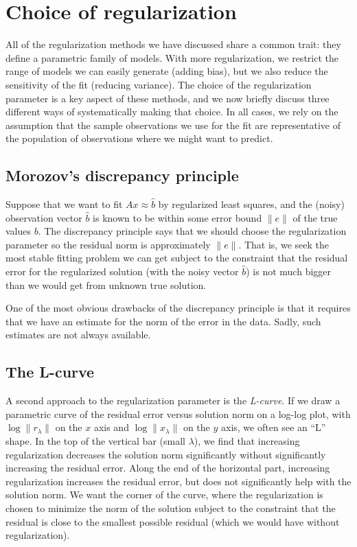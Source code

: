 \section{Choice of regularization}

All of the regularization methods we have discussed share a common
trait: they define a parametric family of models.  With more
regularization, we restrict the range of models we can easily generate
(adding bias), but we also reduce the sensitivity of the fit (reducing
variance). The choice of the regularization parameter is a key aspect of
these methods, and we now briefly discuss three different ways of
systematically making that choice.  In all cases, we
rely on the assumption that the sample observations we use for the
fit are representative of the population of observations where we might
want to predict.

\subsection{Morozov's discrepancy principle}

Suppose that we want to fit $Ax \approx \hat{b}$ by regularized least
squares, and the (noisy) observation vector $\hat{b}$ is known to be
within some error bound $\|e\|$ of the true values $b$. The discrepancy
principle says that we should choose the regularization parameter so the
residual norm is approximately $\|e\|$. That is, we seek the most stable
fitting problem we can get subject to the constraint that the residual
error for the regularized solution (with the noisy vector $\hat{b}$) is
not much bigger than we would get from unknown true solution.

One of the most obvious drawbacks of the discrepancy principle is that
it requires that we have an estimate for the norm of the error in the
data.  Sadly, such estimates are not always available.

\subsection{The L-curve}

A second approach to the regularization parameter is the {\em L-curve}.
If we draw a parametric curve of the residual error versus solution norm
on a log-log plot, with $\log \|r_{\lambda}\|$ on the $x$ axis
and $\log \|x_{\lambda}\|$ on the $y$ axis, we often see an ``L'' shape.
In the top of the vertical bar (small $\lambda$), we find that increasing
regularization decreases the solution norm significantly without significantly
increasing the residual error.  Along the end of the horizontal part,
increasing regularization increases the residual error, but does not
significantly help with the solution norm.  We want the corner of the
curve, where the regularization is chosen to minimize the norm of the
solution subject to the constraint that the residual is close to the
smallest possible residual (which we would have without regularization).

